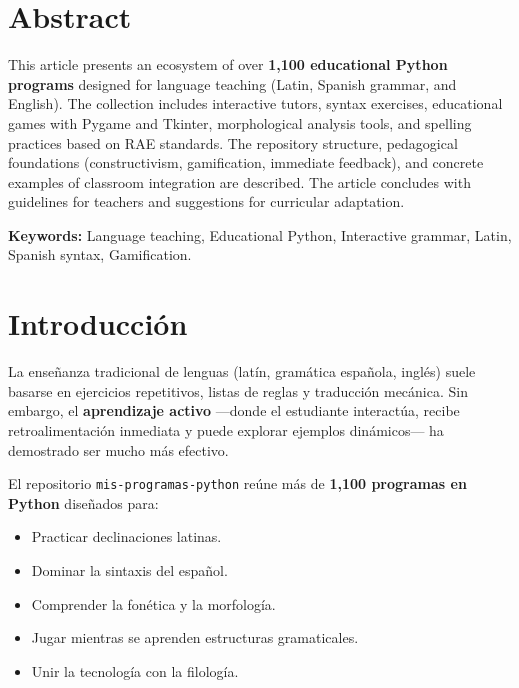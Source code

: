 \documentclass[12pt,spanish]{article}
\begin{document}
\newpage

\section*{Abstract}

This article presents an ecosystem of over \textbf{1,100 educational Python programs} designed for language teaching (Latin, Spanish grammar, and English). The collection includes interactive tutors, syntax exercises, educational games with Pygame and Tkinter, morphological analysis tools, and spelling practices based on RAE standards. The repository structure, pedagogical foundations (constructivism, gamification, immediate feedback), and concrete examples of classroom integration are described. The article concludes with guidelines for teachers and suggestions for curricular adaptation.

\textbf{Keywords:} Language teaching, Educational Python, Interactive grammar, Latin, Spanish syntax, Gamification.

\newpage

\tableofcontents
\newpage

\section{Introducción}

La enseñanza tradicional de lenguas (latín, gramática española, inglés) suele basarse en ejercicios repetitivos, listas de reglas y traducción mecánica. Sin embargo, el \textbf{aprendizaje activo} —donde el estudiante interactúa, recibe retroalimentación inmediata y puede explorar ejemplos dinámicos— ha demostrado ser mucho más efectivo.

El repositorio \texttt{mis-programas-python} reúne más de \textbf{1,100 programas en Python} diseñados para:

\begin{itemize}
    \item Practicar declinaciones latinas.
    \item Dominar la sintaxis del español.
    \item Comprender la fonética y la morfología.
    \item Jugar mientras se aprenden estructuras gramaticales.
    \item Unir la tecnología con la filología.
\end{itemize}
\end{document}
